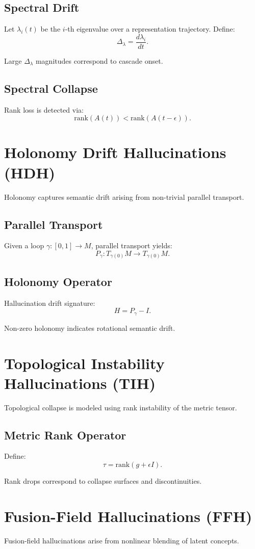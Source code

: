 \documentclass[11pt]{article}
\begin{document}
\subsection{Spectral Drift}
Let $\lambda_i(t)$ be the $i$-th eigenvalue over a representation trajectory.
Define:
\[
\Delta_\lambda = \frac{d\lambda_i}{dt}.
\]

Large $\Delta_\lambda$ magnitudes correspond to cascade onset.

\subsection{Spectral Collapse}
Rank loss is detected via:
\[
\text{rank}(A(t)) < \text{rank}(A(t-\epsilon)).
\]

\section{Holonomy Drift Hallucinations (HDH)}
Holonomy captures semantic drift arising from non-trivial parallel transport.

\subsection{Parallel Transport}
Given a loop $\gamma : [0,1] \to M$, parallel transport yields:
\[
P_\gamma : T_{\gamma(0)}M \to T_{\gamma(0)}M.
\]

\subsection{Holonomy Operator}
Hallucination drift signature:
\[
H = P_\gamma - I.
\]

Non-zero holonomy indicates rotational semantic drift.

\section{Topological Instability Hallucinations (TIH)}
Topological collapse is modeled using rank instability of the metric tensor.

\subsection{Metric Rank Operator}
Define:
\[
\tau = \text{rank}(g + \epsilon I).
\]

Rank drops correspond to collapse surfaces and discontinuities.

\section{Fusion-Field Hallucinations (FFH)}
Fusion-field hallucinations arise from nonlinear blending of latent concepts.
\end{document}
